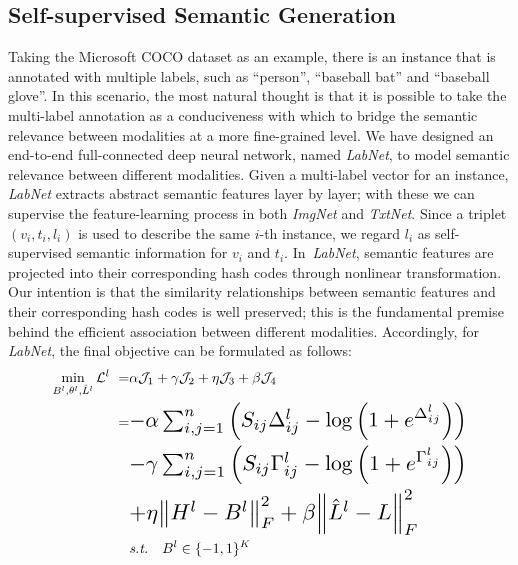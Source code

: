 \documentclass[10pt,twocolumn,letterpaper]{article}
\begin{document}
\subsection{Self-supervised Semantic Generation}
\vspace{-0.15cm}
Taking the Microsoft COCO dataset as an example, there is an instance that is annotated with multiple labels, such as ``person'', ``baseball bat'' and ``baseball glove''. In this scenario, the most natural thought is that it is possible to take the multi-label annotation as a conduciveness with which to bridge the semantic relevance between modalities at a more fine-grained level. 
We have designed an end-to-end full-connected deep neural network, named \emph{LabNet}, to model semantic relevance between different modalities. Given a multi-label vector for an instance, \emph{LabNet} extracts abstract semantic features layer by layer; with these we can supervise the feature-learning process in both \emph{ImgNet} and \emph{TxtNet}. Since a triplet $(v_i, t_i, l_i)$ is used to describe the same $i$-th instance, we regard $l_i$ as self-supervised semantic information for $v_i$ and $t_i$. In~\emph{LabNet}, semantic features are projected into their corresponding hash codes through nonlinear transformation. Our intention is that the similarity relationships between semantic features and their corresponding hash codes is well preserved; this is the fundamental premise behind the efficient association between different modalities. Accordingly, for \emph{LabNet}, the final objective can be formulated as follows:
\vspace{-0.15cm}
\begin{equation}
\label{eq:labobjFunc}
\begin{aligned}
\min\limits_{B^{l},\theta^{l}, \hat{L}^{l}}\mathcal{L}^{l} \ =& \alpha \mathcal{J}_{1} + \gamma \mathcal{J}_{2} + \eta \mathcal{J}_{3} + \beta \mathcal{J}_{4} \\
=&\resizebox{0.7\hsize}{!}{$-\alpha \sum _{ i,j=1 }^{ n }{ \left( { S }_{ ij }{ \Delta  }_{ ij }^{l}-\log { \left( 1+{ e }^{ { \Delta  }_{ ij }^{l} } \right)  }  \right)  }$}  \\
&\resizebox{0.7\hsize}{!}{$-\gamma \sum _{ i,j=1 }^{ n }{ \left( { S }_{ ij }{ \Gamma  }_{ ij }^{l}-\log { \left( 1+{ e }^{ { \Gamma  }_{ ij }^{l} } \right)  }  \right)  }$} \\
&\resizebox{0.6\hsize}{!}{$+\eta { \left\| {H}^{l}-{ B }^{ l } \right\|  }_{ F }^{ 2 }+\beta { \left\| { \hat{ L } }^{l}- L \right\|  }_{ F }^{ 2 }$}\\
&\emph{s.t.} \quad {B}^{l}\in \{-1, 1\}^K
\end{aligned}
\end{equation}
\end{document}
